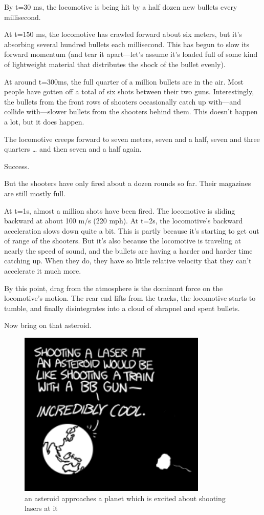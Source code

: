 {By t=30 ms, the locomotive is being hit by a half dozen new bullets every millisecond.}

{At t=150 ms, the locomotive has crawled forward about six meters, but it’s absorbing several hundred bullets each millisecond. This has begun to slow its forward momentum (and tear it apart—let’s assume it’s loaded full of some kind of lightweight material that distributes the shock of the bullet evenly).}

{At around t=300ms, the full quarter of a million bullets are in the air. Most people have gotten off a total of six shots between their two guns. Interestingly, the bullets from the front rows of shooters occasionally catch up with—and collide with—slower bullets from the shooters behind them. This doesn’t happen a lot, but it does happen.}

{The locomotive creeps forward to seven meters, seven and a half, seven and three quarters … and then seven and a half again.}

{Success.}

{But the shooters have only fired about a dozen rounds so far. Their magazines are still mostly full.}

{At t=1s, almost a million shots have been fired. The locomotive is sliding backward at about 100 m/s (220 mph). At t=2s, the locomotive’s backward acceleration slows down quite a bit. This is partly because it’s starting to get out of range of the shooters. But it’s also because the locomotive is traveling at nearly the speed of sound, and the bullets are having a harder and harder time catching up. When they do, they have so little relative velocity that they can’t accelerate it much more.}

{By this point, drag from the atmosphere is the dominant force on the locomotive’s motion. The rear end lifts from the tracks, the locomotive starts to tumble, and finally disintegrates into a cloud of shrapnel and spent bullets.}

{Now bring on that asteroid.}

\begin{figure}[!htbp]
\centering
\includegraphics[scale=0.5, max width=0.8\textwidth]{imgs/a/18/bb_asteroid.png}
\caption{an asteroid approaches a planet which is excited about shooting lasers at it}
\end{figure}

